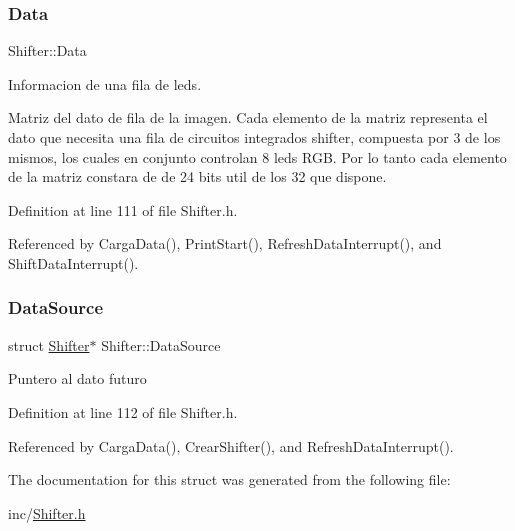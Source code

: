 \subsubsection{\texorpdfstring{Data}{Data}}
{\footnotesize\ttfamily Shifter\+::\+Data}



Informacion de una fila de leds. 

Matriz del dato de fila de la imagen. Cada elemento de la matriz representa el dato que necesita una fila de circuitos integrados shifter, compuesta por 3 de los mismos, los cuales en conjunto controlan 8 leds R\+GB. Por lo tanto cada elemento de la matriz constara de de 24 bits util de los 32 que dispone. 

Definition at line 111 of file Shifter.\+h.



Referenced by Carga\+Data(), Print\+Start(), Refresh\+Data\+Interrupt(), and Shift\+Data\+Interrupt().

\mbox{\label{structShifter_a7c2c0de3d2c63e31863ed44845d63ba8}} 
\subsubsection{\texorpdfstring{Data\+Source}{DataSource}}
{\footnotesize\ttfamily struct \mbox{\hyperlink{structShifter}{Shifter}}$\ast$ Shifter\+::\+Data\+Source}

Puntero al dato futuro 

Definition at line 112 of file Shifter.\+h.



Referenced by Carga\+Data(), Crear\+Shifter(), and Refresh\+Data\+Interrupt().



The documentation for this struct was generated from the following file\+:\begin{DoxyCompactItemize}
\item 
inc/\mbox{\hyperlink{Shifter_8h}{Shifter.\+h}}\end{DoxyCompactItemize}
